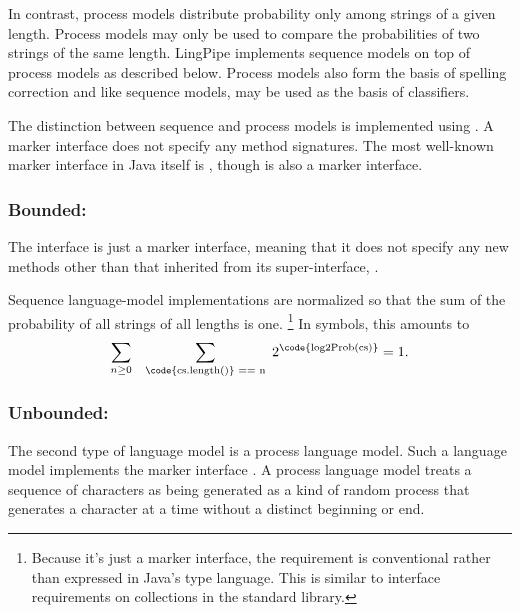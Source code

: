 In contrast, process models distribute probability only among strings
of a given length.  Process models may only be used to compare the
probabilities of two strings of the same length.  LingPipe implements
sequence models on top of process models as described below.  Process
models also form the basis of spelling correction and like sequence
models, may be used as the basis of classifiers.

The distinction between sequence and process models is implemented
using .  A marker interface does not
specify any method signatures.  The most well-known marker interface
in Java itself is , though
 is also a marker interface.


\subsubsection{Bounded: }

The interface  is just a marker
interface, meaning that it does not specify any new methods other than
that inherited from its super-interface, .

Sequence language-model implementations are normalized so that the sum
of the probability of all strings of all lengths is one.%
%
\footnote{Because it's just a marker interface, the requirement is
  conventional rather than expressed in Java's type language.  This is
  similar to interface requirements on collections in the
  standard  library.}
%
In symbols, this amounts to
%
\begin{equation}
\sum_{n \geq 0} \hspace*{8pt} \sum_{\text{\code{cs.length()} == n}} \hspace*{3pt} 2^{\text{\code{log2Prob(cs)}}} = 1.
\end{equation}

\subsubsection{Unbounded: }

The second type of language model is a process language model.  Such a
language model implements the marker interface
.  A process language model treats a
sequence of characters as being generated as a kind of random process
that generates a character at a time without a distinct beginning or
end.

